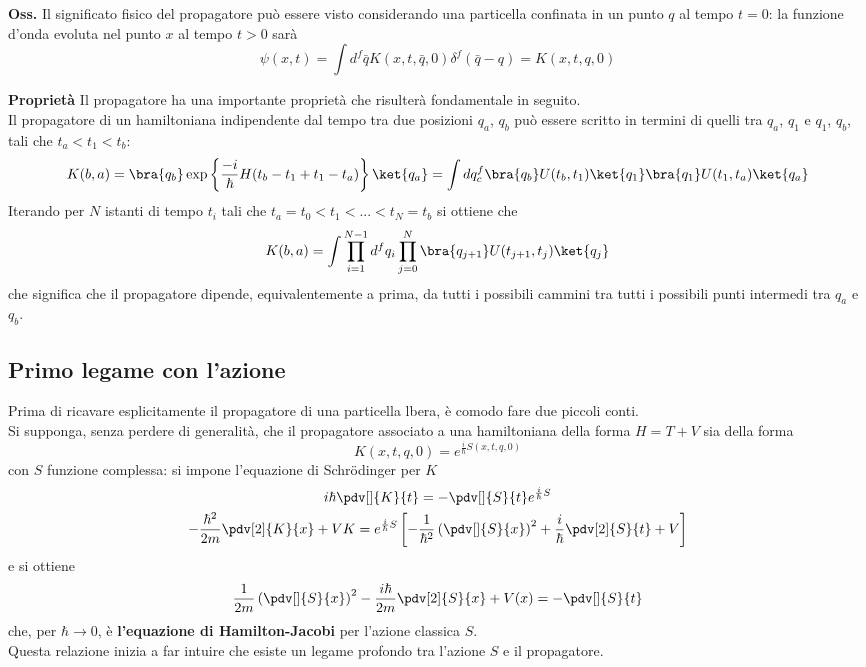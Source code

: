 \textbf{Oss.} Il significato fisico del propagatore può essere visto considerando una particella confinata
in un punto $q$ al tempo $t=0$: la funzione d'onda evoluta nel punto $x$ al tempo $t>0$ sarà
$$\psi(x,t) = \int d^f\bar q K(x,t,\bar q,0)\delta^f(\bar q-q) = K(x,t,q,0) $$

\textbf{Proprietà} Il propagatore ha una importante proprietà che risulterà fondamentale in seguito.
\\Il propagatore di un hamiltoniana indipendente dal tempo tra due posizioni $q_a$, $q_b$ può essere
scritto in termini di quelli tra $q_a$, $q_1$ e $q_1$, $q_b$, tali che $t_a<t_1<t_b$:
$$K(b,a) = \bra{q_b}\exp\left\{\frac{-i}{\hbar}H(t_b-t_1+t_1-t_a)\right\}\ket{q_a} = 
\int dq^f_c\bra{q_b}U(t_b,t_1)\ket{q_1}\bra{q_1}U(t_1,t_a)\ket{q_a}
$$
Iterando per $N$ istanti di tempo $t_i$ tali che $t_a=t_0<t_1<...<t_N=t_b$ si ottiene che
\begin{equation}
    K(b,a)=\int \prod_{i=1}^{N-1} d^fq_i \prod_{j=0}^{N}\bra{q_{j+1}}U(t_{j+1},t_j)\ket{q_j}
    \label{eq:K_iter}
\end{equation}
che significa che il propagatore dipende, equivalentemente a prima, da tutti i possibili cammini tra
tutti i possibili punti intermedi tra $q_a$ e $q_b$.

\subsection{Primo legame con l'azione}
Prima di ricavare esplicitamente il propagatore di una particella lbera, è comodo fare due piccoli conti.\\
Si supponga, senza perdere di generalità, che il propagatore associato a una hamiltoniana della forma
$H = T + V$ sia della forma
$$K(x,t,q,0) = e^{\frac{i}{\hbar}S(x,t,q,0)}$$
con $S$ funzione complessa: si impone l'equazione di Schrödinger per $K$
\begin{gather*}
i\hbar\pdv[]{K}{t}=-\pdv[]{S}{t}e^{\frac{i}{\hbar}S}\\
-\frac{\hbar^2}{2m}\pdv[2]{K}{x}+VK=e^{\frac{i}{\hbar}S}\left[-\frac{1}{\hbar^2}\left(\pdv[]{S}{x}\right)^2 +
\frac{i}{\hbar}\pdv[2]{S}{t}+V\right]
\end{gather*}
e si ottiene
$$\frac{1}{2m}\left(\pdv[]{S}{x}\right)^2-\frac{i\hbar}{2m}\pdv[2]{S}{x}+V(x) = -\pdv[]{S}{t}$$
che, per $\hbar\rightarrow0$, è \textbf{l'equazione di Hamilton-Jacobi} per l'azione classica $S$.\\
Questa relazione inizia a far intuire che esiste un legame profondo tra l'azione $S$ e il propagatore.

